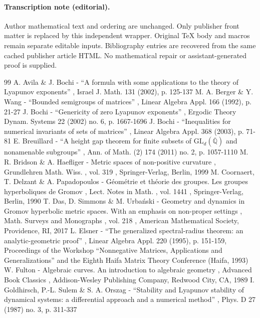 \documentclass[11pt]{article}
\begin{document}
\paragraph{Transcription note (editorial).}
Author mathematical text and ordering are unchanged. Only publisher front matter is replaced by this independent wrapper. Original TeX body and macros remain separate editable inputs. Bibliography entries are recovered from the same cached publisher article HTML. No mathematical repair or assistant-generated proof is supplied.
\clearpage

\begin{thebibliography}{99}
 A. Avila \& J. Bochi - “A formula with some applications to the theory of Lyapunov exponents” , Israel J. Math. 131 (2002), p. 125-137
 M. A. Berger \& Y. Wang - “Bounded semigroups of matrices” , Linear Algebra Appl. 166 (1992), p. 21-27
 J. Bochi - “Genericity of zero Lyapunov exponents” , Ergodic Theory Dynam. Systems 22 (2002) no. 6, p. 1667-1696
 J. Bochi - “Inequalities for numerical invariants of sets of matrices” , Linear Algebra Appl. 368 (2003), p. 71-81
 E. Breuillard - “A height gap theorem for finite subsets of \(\mathrm{GL}_d(\overline{\mathbb Q})\) and nonamenable subgroups” , Ann. of Math. (2) 174 (2011) no. 2, p. 1057-1110
 M. R. Bridson \& A. Haefliger - Metric spaces of non-positive curvature , Grundlehren Math. Wiss. , vol. 319 , Springer-Verlag, Berlin, 1999
 M. Coornaert, T. Delzant \& A. Papadopoulos - Géométrie et théorie des groupes. Les groupes hyperboliques de Gromov , Lect. Notes in Math. , vol. 1441 , Springer-Verlag, Berlin, 1990
 T. Das, D. Simmons \& M. Urbański - Geometry and dynamics in Gromov hyperbolic metric spaces. With an emphasis on non-proper settings , Math. Surveys and Monographs , vol. 218 , American Mathematical Society, Providence, RI, 2017
 L. Elsner - “The generalized spectral-radius theorem: an analytic-geometric proof” , Linear Algebra Appl. 220 (1995), p. 151-159, Proceedings of the Workshop “Nonnegative Matrices, Applications and Generalizations” and the Eighth Haifa Matrix Theory Conference (Haifa, 1993)
 W. Fulton - Algebraic curves. An introduction to algebraic geometry , Advanced Book Classics , Addison-Wesley Publishing Company, Redwood City, CA, 1989
 I. Goldhirsch, P.-L. Sulem \& S. A. Orszag - “Stability and Lyapunov stability of dynamical systems: a differential approach and a numerical method” , Phys. D 27 (1987) no. 3, p. 311-337

\end{thebibliography}
\end{document}
